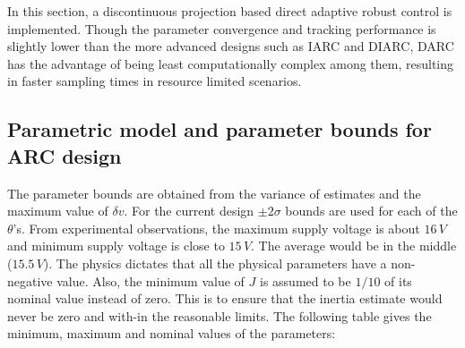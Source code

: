 In this section, a discontinuous projection based direct adaptive robust control
is implemented. Though the parameter convergence and tracking performance is
slightly lower than the  more advanced designs such as IARC and DIARC, DARC has
the advantage of being least computationally complex among them, resulting in
faster sampling times in resource limited scenarios.


\subsection{Parametric model and parameter bounds for ARC design}

The parameter bounds are obtained from the variance of estimates and the
maximum value of $\delta v$. For the current design $\pm 2\sigma$ bounds are
used for each of the $\theta$'s. From experimental observations, the maximum
supply voltage is about $16\, V$ and minimum supply voltage is close to $15\,
V$. The average would be in the middle ($15.5\, V$). The physics dictates that
all the physical parameters have a non-negative value. Also, the minimum value
of $J$ is assumed to be $1/10$ of its nominal value instead of zero. This is to
ensure that the inertia estimate would never be zero and with-in the reasonable
limits. The following table gives the minimum, maximum and nominal values of the parameters:

